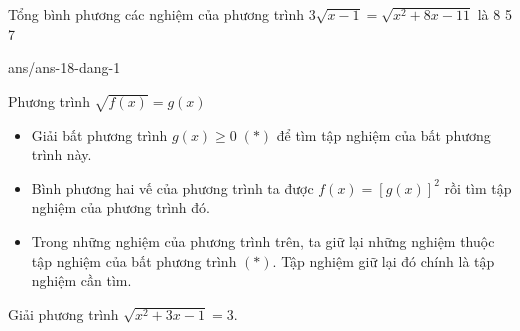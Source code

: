 \begin{ex}%
	Tổng bình phương các nghiệm của	 phương trình $3\sqrt{x-1}=\sqrt{x^2+8x-11}$ là
	\choice
	{}
	{8}
	{5}
	{7}
\end{ex}

\begin{indapan}{10}
	{ans/ans-18-dang-1}
\end{indapan}
\begin{dang}{Phương trình $\sqrt{f(x)}=g(x)$}
	\begin{itemize}
		\item Giải bất phương trình $g(x)\geq 0\; (*)$ để tìm tập nghiệm của bất phương trình này.
		\item Bình phương hai vế của phương trình ta được $f(x)=\left[g(x)\right]^2$ rồi tìm tập nghiệm của phương trình đó.
		\item Trong những nghiệm của phương trình trên, ta giữ lại những nghiệm thuộc tập nghiệm của bất phương trình $(*)$. Tập nghiệm giữ lại đó chính là tập nghiệm cần tìm.
	\end{itemize}
\end{dang}
\viduminhhoa
\begin{vd}%
	Giải phương trình $\sqrt{x^2+3x-1}=3$.
\end{vd}

